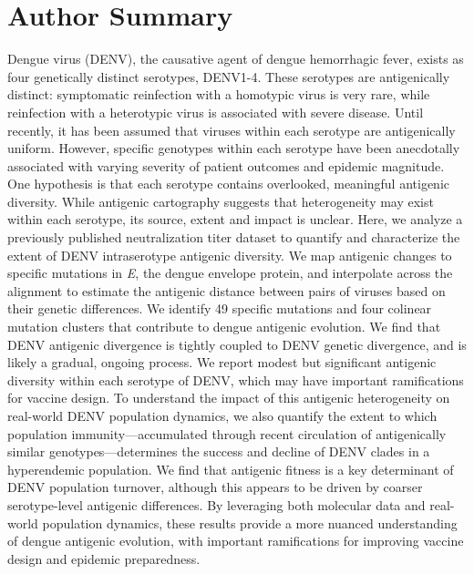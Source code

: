 \documentclass[11pt,oneside,letterpaper]{article}
\begin{document}
\section*{Author Summary}
Dengue virus (DENV), the causative agent of dengue hemorrhagic fever, exists as four genetically distinct serotypes, DENV1-4.
These serotypes are antigenically distinct: symptomatic reinfection with a homotypic virus is very rare, while reinfection with a heterotypic virus is associated with severe disease.
Until recently, it has been assumed that viruses within each serotype are antigenically uniform.
However, specific genotypes within each serotype have been anecdotally associated with varying severity of patient outcomes and epidemic magnitude.
One hypothesis is that each serotype contains overlooked, meaningful antigenic diversity.
While antigenic cartography suggests that heterogeneity may exist within each serotype, its source, extent and impact is unclear.
Here, we analyze a previously published neutralization titer dataset to quantify and characterize the extent of DENV intraserotype antigenic diversity.
We map antigenic changes to specific mutations in \textit{E}, the dengue envelope protein, and interpolate across the alignment to estimate the antigenic distance between pairs of viruses based on their genetic differences.
We identify 49 specific mutations and four colinear mutation clusters that contribute to dengue antigenic evolution.
We find that DENV antigenic divergence is tightly coupled to DENV genetic divergence, and is likely a gradual, ongoing process.
We report modest but significant antigenic diversity within each serotype of DENV, which may have important ramifications for vaccine design.
To understand the impact of this antigenic heterogeneity on real-world DENV population dynamics, we also quantify the extent to which population immunity---accumulated through recent circulation of antigenically similar genotypes---determines the success and decline of DENV clades in a hyperendemic population.
We find that antigenic fitness is a key determinant of DENV population turnover, although this appears to be driven by coarser serotype-level antigenic differences.
By leveraging both molecular data and real-world population dynamics, these results provide a more nuanced understanding of dengue antigenic evolution, with important ramifications for improving vaccine design and epidemic preparedness.

\pagebreak
\end{document}
